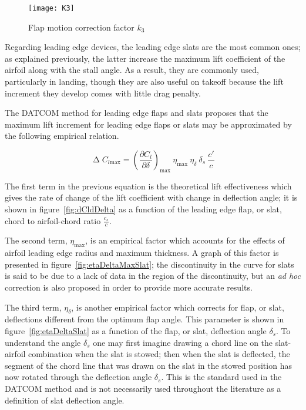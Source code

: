 \begin{figure}[H]
  \centering
  \texttt{[image: K3]}
  \caption{Flap motion correction factor $k_3$}
  \label{fig:k3}
\end{figure}

\noindent
Regarding leading edge devices, the leading edge slats are the most common ones; as explained previously, the latter increase the maximum lift coefficient of the airfoil along with the stall angle. As a result, they are commonly used, particularly in landing, though they are also useful on takeoff because the lift increment they develop comes with little drag penalty.

The \gls{DATCOM} method for leading edge flaps and slats proposes that the maximum lift increment for leading edge flaps or slats may be approximated by the following empirical relation.

\begin{equation}
\upDelta C_{l\text{max}}=\left(\dfrac{\partial C_l}{\partial \delta}\right)_{\text{max}}\ \eta_{\text{max}}\ \eta_\delta\ \delta_s\ \dfrac{c'}{c}
\label{eqn:DeltaClmaxSlat}
\end{equation}

\noindent
The first term in the previous equation is the theoretical lift effectiveness which gives the rate of change of the lift coefficient with change in deflection angle; it is shown in figure~\ref{fig:dCldDelta} as a function of the leading edge flap, or slat, chord to airfoil-chord ratio $\frac{c_s}{c}$.

The second term, $\eta_{\text{max}}$, is an empirical factor which accounts for the effects of airfoil leading edge radius and maximum thickness. A graph of this factor is presented in figure~\ref{fig:etaDeltaMaxSlat}; the discontinuity in the curve for slats is said to be due to a lack of data in the region of the discontinuity, but an \emph{ad hoc} correction is also proposed in order to provide more accurate results.

The third term, $\eta_\delta$, is another empirical factor which corrects for flap, or slat, deflections different from the optimum flap angle. This parameter is shown in figure~\ref{fig:etaDeltaSlat} as a function of the flap, or slat, deflection angle $\delta_s$. To understand the angle $\delta_s$ one may first imagine
drawing a chord line on the slat-airfoil combination when the slat is stowed; then when the slat is deflected, the segment of the chord line that was drawn on
the slat in the stowed position has now rotated through the deflection angle $\delta_s$. This is the standard used in the \gls{DATCOM} method and is not necessarily used throughout the literature as a definition of slat deflection angle.

